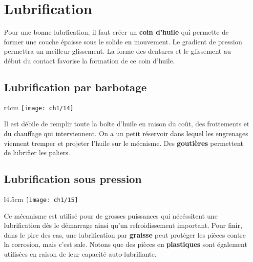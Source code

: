 \section{Lubrification}
\noindent Pour une bonne lubrfication, il faut créer un \textbf{coin d'huile} qui permette de former une couche épaisse sous le solide en mouvement. Le gradient de pression permettra un meilleur glissement. La forme des dentures et le glissement au début du contact favorise la formation de ce coin d'huile. 

\subsection{Lubrification par barbotage}
	\begin{wrapfigure}[5]{r}{4cm}
	\vspace{-5mm}
	\texttt{[image: ch1/14]}
	\end{wrapfigure}	
	\noindent Il est débile de remplir toute la boîte d'huile en raison du coût, des frottements et du chauffage qui interviennent. On a un petit réservoir dans lequel les engrenages viennent tremper et projeter l'huile sur le mécnisme. Des \textbf{goutières} permettent de lubrifier les paliers. 
	
\subsection{Lubrification sous pression}
	\begin{wrapfigure}[6]{l}{4.5cm}
	\vspace{-5mm}
	\texttt{[image: ch1/15]}
	\end{wrapfigure}	
	\noindent Ce mécanisme est utilisé pour de grosses puissances qui nécéssitent une lubrification dès le démarrage ainsi qu'un refroidissement important. Pour finir, dans le pire des cas, une lubrification par \textbf{graisse} peut protéger les pièces contre la corrosion, mais c'est sale. Notons que des pièces en \textbf{plastiques} sont également utilisées en raison de leur capacité auto-lubrifiante.